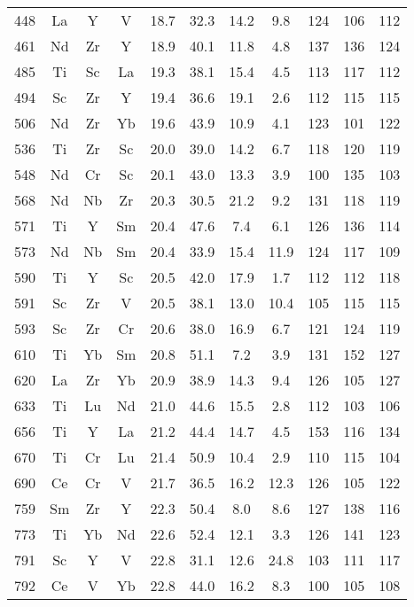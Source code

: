 \begin{center}
\begin{xtabular}{c|ccc|cccc|ccc}
 448 &   La &    Y &    V & 18.7 & 32.3 & 14.2 &  9.8 &  124 &  106 &  112 \\
 461 &   Nd &   Zr &    Y & 18.9 & 40.1 & 11.8 &  4.8 &  137 &  136 &  124 \\
 485 &   Ti &   Sc &   La & 19.3 & 38.1 & 15.4 &  4.5 &  113 &  117 &  112 \\
 494 &   Sc &   Zr &    Y & 19.4 & 36.6 & 19.1 &  2.6 &  112 &  115 &  115 \\
 506 &   Nd &   Zr &   Yb & 19.6 & 43.9 & 10.9 &  4.1 &  123 &  101 &  122 \\
 536 &   Ti &   Zr &   Sc & 20.0 & 39.0 & 14.2 &  6.7 &  118 &  120 &  119 \\
 548 &   Nd &   Cr &   Sc & 20.1 & 43.0 & 13.3 &  3.9 &  100 &  135 &  103 \\
 568 &   Nd &   Nb &   Zr & 20.3 & 30.5 & 21.2 &  9.2 &  131 &  118 &  119 \\
 571 &   Ti &    Y &   Sm & 20.4 & 47.6 &  7.4 &  6.1 &  126 &  136 &  114 \\
 573 &   Nd &   Nb &   Sm & 20.4 & 33.9 & 15.4 & 11.9 &  124 &  117 &  109 \\
 590 &   Ti &    Y &   Sc & 20.5 & 42.0 & 17.9 &  1.7 &  112 &  112 &  118 \\
 591 &   Sc &   Zr &    V & 20.5 & 38.1 & 13.0 & 10.4 &  105 &  115 &  115 \\
 593 &   Sc &   Zr &   Cr & 20.6 & 38.0 & 16.9 &  6.7 &  121 &  124 &  119 \\
 610 &   Ti &   Yb &   Sm & 20.8 & 51.1 &  7.2 &  3.9 &  131 &  152 &  127 \\
 620 &   La &   Zr &   Yb & 20.9 & 38.9 & 14.3 &  9.4 &  126 &  105 &  127 \\
 633 &   Ti &   Lu &   Nd & 21.0 & 44.6 & 15.5 &  2.8 &  112 &  103 &  106 \\
 656 &   Ti &    Y &   La & 21.2 & 44.4 & 14.7 &  4.5 &  153 &  116 &  134 \\
 670 &   Ti &   Cr &   Lu & 21.4 & 50.9 & 10.4 &  2.9 &  110 &  115 &  104 \\
 690 &   Ce &   Cr &    V & 21.7 & 36.5 & 16.2 & 12.3 &  126 &  105 &  122 \\
 759 &   Sm &   Zr &    Y & 22.3 & 50.4 &  8.0 &  8.6 &  127 &  138 &  116 \\
 773 &   Ti &   Yb &   Nd & 22.6 & 52.4 & 12.1 &  3.3 &  126 &  141 &  123 \\
 791 &   Sc &    Y &    V & 22.8 & 31.1 & 12.6 & 24.8 &  103 &  111 &  117 \\
 792 &   Ce &    V &   Yb & 22.8 & 44.0 & 16.2 &  8.3 &  100 &  105 &  108 \\

\end{xtabular}
\end{center}
